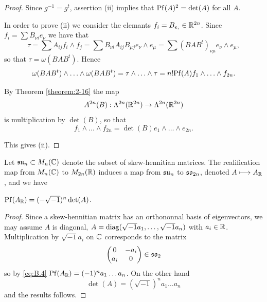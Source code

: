 \begin{proof}
Since $g^{-1}=g^t$, assertion (ii) implies that $\mathrm{Pf}(A)^2=\det(A)$ for all $A$.

In order to prove (ii) we consider the elemants $f_i=B_{e_i}\in{\ensuremath{\mathbb{R}}}^{2n}$. Since $f_i=\sum B_{\nu i}e_\nu$ we have that 
\[
  \tau = \sum A_{ij}f_i\wedge f_j 
  = \sum B_{\nu i}A_{ij}B_{\mu j} e_\nu\wedge e_\mu
  = \sum (BAB^t)_{\nu\mu} e_\nu\wedge e_\mu,
\]
so that $\tau=\omega(BAB^t)$. Hence 
\[
  \omega(BAB^t)\wedge\ldots\wedge\omega(BAB^t)
  = \tau\wedge\ldots\wedge\tau
  = n!\mathrm{Pf}(A)f_1\wedge\ldots\wedge f_{2n}.
\]

By Theorem \ref{theorem:2-16} the map 
\[
    A^{2n}(B):\Lambda^{2n}({\mathbb{R}}^{2n})\to \Lambda^{2n}({\mathbb{R}}^{2n})
\]
is multiplication by $\det(B)$, so that 
\[
    f_1\wedge\ldots\wedge f_{2n} = \det(B)e_1\wedge\ldots\wedge e_{2n}.
\]

This gives (ii).
\end{proof}

Let $\mathfrak{su}_{n}\subset M_n({\mathbb{C}})$ denote the subset of skew-hennitian matrices. The realification
map from $M_n({\mathbb{C}})$ to $M_{2n}({\mathbb{R}})$ induces a map from $\mathfrak{su}_n$ to $\mathfrak{so}_{2n}$, denoted $A\longmapsto A_{\mathbb{R}}$,
and we have
\begin{theorem}\label{theorem:B.6}
  $\mathrm{Pf}(A_{\mathbb{R}}) = (-\sqrt{-1})^n\det(A)$.
\end{theorem}

\begin{proof}
  Since a skew-hennitian matrix has an orthononnal basis of eigenvectors,
we may assume $A$ is diagonal, $A = \operatorname{diag}(\sqrt{-1}a_1,\ldots, \sqrt{-1}a_n)$ with $a_i\in{\ensuremath{\mathbb{R}}}$.
Multiplication by $\sqrt{-1}a_i$ on ${\mathbb{C}}$ corresponds to the matrix
\[
\begin{pmatrix}
  0 & -a_i \\
  a_i & 0 
\end{pmatrix}
\in \mathfrak{so}_2
\]
so by \eqref{eq:B.4} $\mathrm{Pf}(A_{\mathbb{R}}) = (-1)^na_1\ldots a_n$. On the other hand 
\[
  \det(A) = (\sqrt{-1})^n a_1\ldots a_n
\]
and the results follows.
\end{proof}
